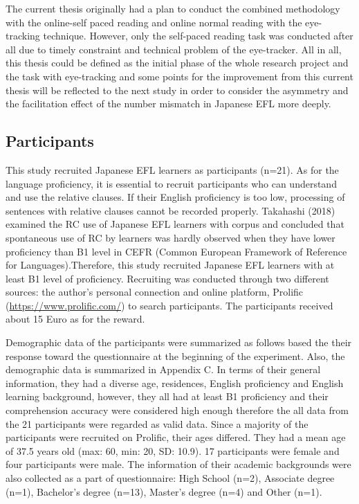 \documentclass[
]{article}
\begin{document}
The current thesis originally had a plan to conduct the combined
methodology with the online-self paced reading and online normal reading
with the eye-tracking technique. However, only the self-paced reading
task was conducted after all due to timely constraint and technical
problem of the eye-tracker. All in all, this thesis could be defined as
the initial phase of the whole research project and the task with
eye-tracking and some points for the improvement from this current
thesis will be reflected to the next study in order to consider the
asymmetry and the facilitation effect of the number mismatch in Japanese
EFL more deeply.

\subsection{Participants}\label{participants}

This study recruited Japanese EFL learners as participants (n=21). As
for the language proficiency, it is essential to recruit participants
who can understand and use the relative clauses. If their English
proficiency is too low, processing of sentences with relative clauses
cannot be recorded properly. Takahashi (2018) examined the RC use of
Japanese EFL learners with corpus and concluded that spontaneous use of
RC by learners was hardly observed when they have lower proficiency than
B1 level in CEFR (Common European Framework of Reference for
Languages).Therefore, this study recruited Japanese EFL learners with at
least B1 level of proficiency. Recruiting was conducted through two
different sources: the author's personal connection and online platform,
Prolific (\url{https://www.prolific.com/}) to search participants. The
participants received about 15 Euro as for the reward.

Demographic data of the participants were summarized as follows based
the their response toward the questionnaire at the beginning of the
experiment. Also, the demographic data is summarized in Appendix C. In
terms of their general information, they had a diverse age, residences,
English proficiency and English learning background, however, they all
had at least B1 proficiency and their comprehension accuracy were
considered high enough therefore the all data from the 21 participants
were regarded as valid data. Since a majority of the participants were
recruited on Prolific, their ages differed. They had a mean age of 37.5
years old (max: 60, min: 20, SD: 10.9). 17 participants were female and
four participants were male. The information of their academic
backgrounds were also collected as a part of questionnaire: High School
(n=2), Associate degree (n=1), Bachelor's degree (n=13), Master's degree
(n=4) and Other (n=1).
\end{document}

